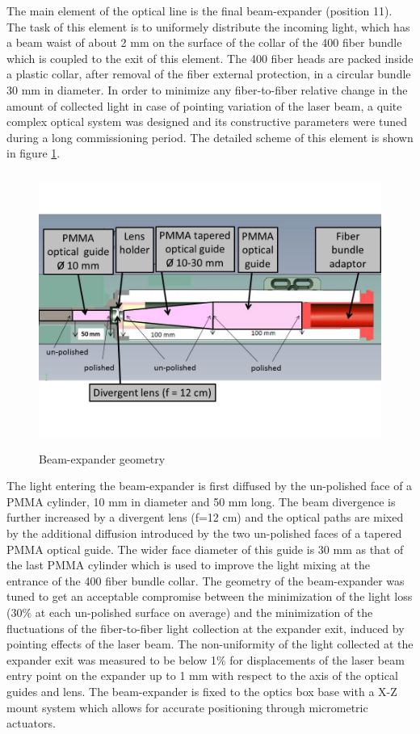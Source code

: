 The main element of the optical line is the final beam-expander (position 11). The
task of this element is to uniformely distribute the incoming light, which has a
beam waist of about 2 mm on the surface of the collar of the 400 fiber bundle which
is coupled to the exit of this element. The 400 fiber heads are packed inside a
plastic collar, after removal of the fiber external protection, in a circular bundle
30 mm in diameter.  In order to minimize any fiber-to-fiber relative change in the
amount of collected light in case of pointing variation of the laser beam, a quite
complex optical system was designed and its constructive parameters were tuned
during a long commissioning period.  The detailed scheme of this element is shown in
figure \ref{fig:x.4}.
% 
\begin{figure}[htb]
\begin{center} 
\includegraphics[width=13cm, height=9cm]{figures/Beam_expander}
\caption{Beam-expander geometry
}\label{fig:x.4}
\end{center}
\end{figure}
%

The light entering the beam-expander is first diffused by the un-polished face of a
PMMA cylinder, 10 mm in diameter and 50 mm long. The beam divergence is further
increased by a divergent lens (f=12 cm) and the optical paths are mixed by the
additional diffusion introduced by the two un-polished faces of a tapered PMMA
optical guide. The wider face diameter of this guide is 30 mm as that of the last
PMMA cylinder which is used to improve the light mixing at
the entrance of the 400 fiber bundle collar. The geometry of the beam-expander was
tuned to get an acceptable compromise between the minimization
of the light loss (30$\%$ at each un-polished surface on average) and the
minimization of the fluctuations of the fiber-to-fiber light collection at the
expander exit, induced by pointing effects of the laser beam. The non-uniformity of
the light collected at the expander exit was measured to be below 1$\%$ for
displacements of the laser beam entry point on the expander up to 1 mm with respect
to the axis of the optical guides and lens. The beam-expander is fixed to the optics
box base with a X-Z mount system which allows for accurate positioning through
micrometric actuators.

